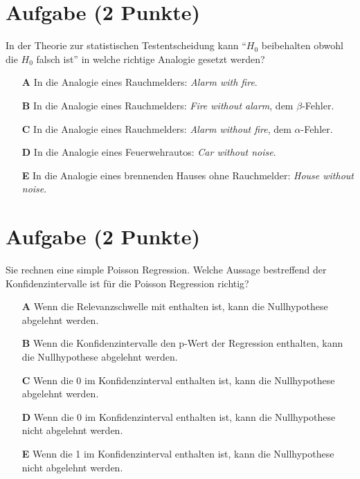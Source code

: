 \documentclass[a4paper, 10pt]{scrartcl}\usepackage[]{graphicx}\usepackage[]{xcolor}
\begin{document}
\section{Aufgabe \hfill (2 Punkte)}



In der Theorie zur statistischen Testentscheidung kann "`$H_0$ beibehalten obwohl die $H_0$ falsch ist"'
in welche richtige Analogie gesetzt werden?



\begin{enumerate}
\item [\textbf{A} \msquare] In die Analogie eines Rauchmelders: \textit{Alarm with fire}.
\item [\textbf{B} \msquare] In die Analogie eines Rauchmelders: \textit{Fire without alarm}, dem $\beta$-Fehler.
\item [\textbf{C} \msquare] In die Analogie eines Rauchmelders: \textit{Alarm without fire}, dem $\alpha$-Fehler.
\item [\textbf{D} \msquare] In die Analogie eines Feuerwehrautos: \textit{Car without noise}.
\item [\textbf{E} \msquare] In die Analogie eines brennenden Hauses ohne Rauchmelder: \textit{House without noise}.
\end{enumerate}

\section{Aufgabe \hfill (2 Punkte)}



Sie rechnen eine simple Poisson Regression. Welche Aussage bestreffend der
Konfidenzintervalle ist f{\"u}r die Poisson Regression richtig?



\begin{enumerate}
\item [\textbf{A} \msquare] Wenn die Relevanzschwelle mit enthalten ist, kann die Nullhypothese abgelehnt werden.
\item [\textbf{B} \msquare] Wenn die Konfidenzintervalle den p-Wert der Regression enthalten, kann die Nullhypothese abgelehnt werden.
\item [\textbf{C} \msquare] Wenn die 0 im Konfidenzinterval enthalten ist, kann die Nullhypothese abgelehnt werden.
\item [\textbf{D} \msquare] Wenn die 0 im Konfidenzinterval enthalten ist, kann die Nullhypothese nicht abgelehnt werden.
\item [\textbf{E} \msquare] Wenn die 1 im Konfidenzinterval enthalten ist, kann die Nullhypothese nicht abgelehnt werden.
\end{enumerate}
\end{document}
